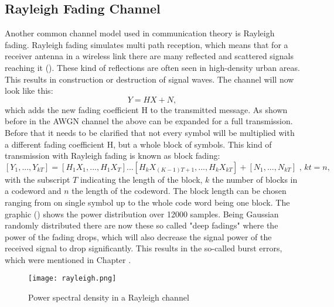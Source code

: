 \subsection{Rayleigh Fading Channel}
\label{sec:rayleigh}
Another common channel model used in communication theory is Rayleigh fading. Rayleigh fading simulates multi path reception, which means that for a receiver antenna in a wireless link there are many reflected and scattered signals reaching it (). These kind of reflections are often seen in high-density urban areas. This results in construction or destruction of signal waves. The channel will now look like this:
\begin{equation}
\label{eq:rayleigh1}
Y = HX + N,  
\end{equation}
which adds the new fading coefficient H to the transmitted message.
\newline
As shown before in the \gls{AWGN} channel the above  can be expanded for a full transmission. Before that it needs to be clarified that not every symbol will be multiplied with a different fading coefficient H, but a whole block of symbols. This kind of transmission with Rayleigh fading is known as block fading:
\begin{equation}
\label{eq:rayleigh2}
[Y_1,...,Y_{kT}] = [H_1X_1,...,H_1X_T]...[H_kX_{(K-1)T+1},...,H_kX_{kT}] + [N_1,...,N_{kT}] \textrm{ , } kt = n,  
\end{equation}
with the subscript $T$ indicating the length of the block, $k$ the number of blocks in a codeword and $n$ the length of the codeword. The block length can be chosen ranging from on single symbol up to the whole code word being one block.
\newline
The graphic () shows the power distribution over 12000 samples. Being Gaussian randomly distributed there are now these so called "deep fadings" where the power of the fading drops, which will also decrease the signal power of the received signal to drop significantly. This results in the so-called burst errors, which were mentioned in Chapter .
\begin{figure}[!htb]
	\centering
	\texttt{[image: rayleigh.png]}
	\caption{Power spectral density in a Rayleigh channel}
	\label{fig:rayleigh}
\end{figure}